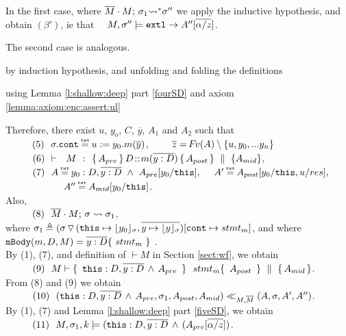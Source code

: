 {\begin{description}
In the first case, where $\overline{M}\cdot M;\, {\sigma_1} {\rightsquigarrow^*} \sigma''$ we apply the inductive hypothesis, and obtain $(\beta')$, ie that \ \ $ M, \sigma'' \models \mbox{\normalfont{\texttt{extl}}} \rightarrow A''[\overline{\alpha/z}]$.

 The second case is analogous.
 
  \item[{\sc{combine}}]  by induction hypothesis, and unfolding and folding the definitions
  
 \item[{\sc{consequ}}]  using Lemma \ref{l:shallow:deep} part \ref{fourSD}  and axiom \ref{lemma:axiom:enc:assert:ul}

%
%
\item[{\sc{Call\_Int}}]
 
 Therefore, there exist $u$, $y_o$, $C$, $\overline y$,  $A_1$ and $A_2$ such that \\
 $\SPS (5) \ \ \sigma.\prg{cont}\txteq u:=y_0.m(\overline y)$,  \ \ \ \ $\overline z = {\hspace{-1pt}F\hspace{-1pt}}v(A)\setminus \{ u, y_0, ... y_n \}$
\\ 
$\strut \ \ \hspace{0.5cm} \ \  (6) \  \ {\vdash \ \ M\ \ \mathbf{:}\ \  \{\, A_{pre}\, \}\, D\!::\!m(\overline{y:D})\, \{\, A_{post}\, \} \, \,\parallel\,\, \{ A_{mid} \}}$, \\
$\SPS (7) \  \ A \txteq y_0:D ,\overline {y:D}\ \wedge \  A_{pre}[y_0/\prg{this}],\ \  \ \ 
A'  \txteq A_{post}[y_0/\prg{this},u/res],$\\
$\strut \hspace{2cm}  \  A'' \txteq  A_{mid}[y_0/\prg{this}]$. 
\\
Also, \\
$\strut \ \ \hspace{0.5cm} \ \  (8) \ \ \overline{M}\cdot M;\, {\sigma} \rightsquigarrow \sigma_1$, \\
 where $\sigma_1\triangleq ( \sigma \, {\triangledown}\,  (\mbox{\normalfont{\texttt{this}}}\mapsto {\lfloor y_0 \rfloor_{\sigma}},{\overline{y \mapsto {\lfloor y \rfloor_{\sigma}}}}) [\mbox{\normalfont{\texttt{cont}}}\mapsto stmt_m]$, and where 
  $\prg{mBody}(m,D,M)=\overline{y:D}\{\    stmt_m\ \}$ .\\
By (1), (7), and definition of $\vdash M$ in Section \ref{sect:wf}, we obtain\\
$\SPS (9) \ \ M \vdash  \quadruple { \ \prg{this}:D,\overline{y:D}\, \wedge\, A_{pre}\  } {\ stmt_m } {\ A_{post}\ } {A_{mid}}$.\\
From (8) and (9) we obtain  \\
$\strut \ \ \hspace{0.5cm} \ \  (10) \ \ (\mbox{\normalfont{\texttt{this}}}:D,\overline{y:D}\, \wedge\, A_{pre},\sigma_1,A_{post}, A_{mid}) \ll_{M,\overline{M}} (A,\sigma,A', A'')$. 
\\
By (1), (7) and Lemma   \ref{l:shallow:deep} part \ref{fiveSD}, we obtain\\
$\strut \ \ \hspace{0.5cm} \ \  (11) \ \  M,\sigma_1 ,{k} \models {(\mbox{\normalfont{\texttt{this}}}:D,\overline{y:D}\, \wedge\, (A_{pre}[\overline{\alpha/z}])} $.


\end{description}}
